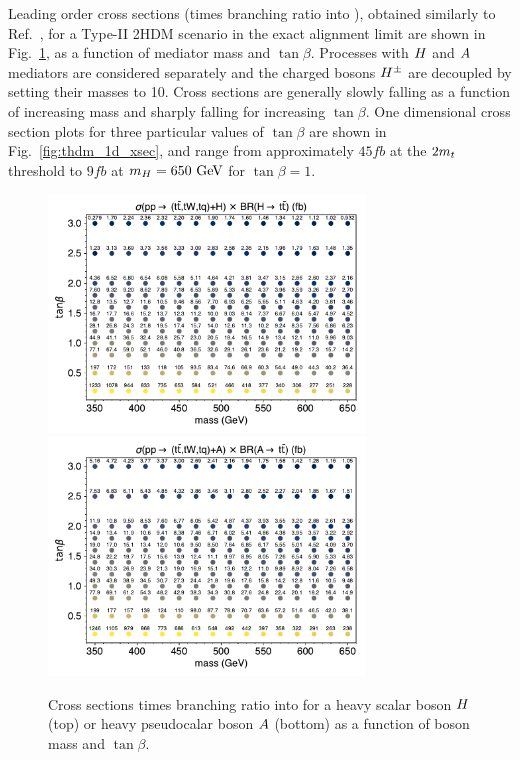 \FloatBarrier

Leading order cross sections (times branching ratio into \ttbar),
obtained similarly to Ref.~\cite{THEORY:Craig2016ygr},
for a
Type-II 2HDM scenario in the exact alignment limit are shown in
Fig.~\ref{fig:thdm_2d_xsecs}, as a function of mediator mass and $\tan\beta$.
Processes with $H$ and $A$ mediators are considered separately and the
charged bosons $H^\pm$ are decoupled by setting their masses to 10\TeV.
Cross sections are generally slowly falling as a function of increasing mass
and sharply falling for increasing $\tan\beta$. One dimensional cross
section plots for three particular values of $\tan\beta$ are shown in
Fig.~\ref{fig:thdm_1d_xsec}, and range from approximately $45\unit{fb}$ at the
$2m_t$ threshold to $9\unit{fb}$ at $m_H=650~\text{GeV}$ for $\tan\beta=1$.

\begin{figure}[htb!]
    \centering
    \includegraphics[width=0.75\textwidth]{figs/ftan/plot_2d_2hdm_xsec_h} \\
    \includegraphics[width=0.75\textwidth]{figs/ftan/plot_2d_2hdm_xsec_a}
\caption{Cross sections times branching ratio into \ttbar for a heavy scalar boson $H$ (top) 
or heavy pseudocalar boson $A$ (bottom) as a function of boson mass and $\tan\beta$.}
\label{fig:thdm_2d_xsecs}
\end{figure}

